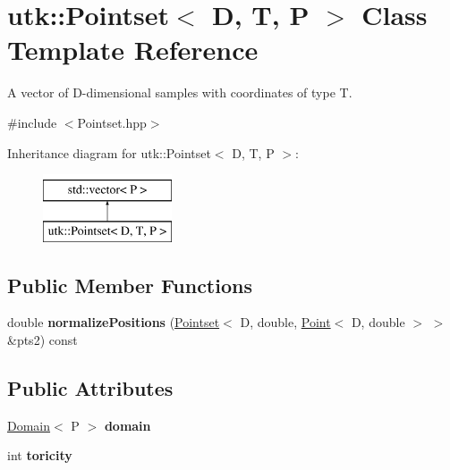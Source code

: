 \hypertarget{classutk_1_1Pointset}{\section{utk\-:\-:Pointset$<$ D, T, P $>$ Class Template Reference}
\label{classutk_1_1Pointset}
}


A vector of D-\/dimensional samples with coordinates of type T.  




{\ttfamily \#include $<$Pointset.\-hpp$>$}

Inheritance diagram for utk\-:\-:Pointset$<$ D, T, P $>$\-:\begin{figure}[H]
\begin{center}
\leavevmode
\includegraphics[height=2.000000cm]{classutk_1_1Pointset}
\end{center}
\end{figure}
\subsection*{Public Member Functions}
\begin{DoxyCompactItemize}
\item 
\hypertarget{classutk_1_1Pointset_ac112d4c6ebce6c272d33da5bb57581fe}{double {\bfseries normalize\-Positions} (\hyperlink{classutk_1_1Pointset}{Pointset}$<$ D, double, \hyperlink{classutk_1_1Point}{Point}$<$ D, double $>$ $>$ \&pts2) const }\label{classutk_1_1Pointset_ac112d4c6ebce6c272d33da5bb57581fe}

\end{DoxyCompactItemize}
\subsection*{Public Attributes}
\begin{DoxyCompactItemize}
\item 
\hypertarget{classutk_1_1Pointset_ae699b217e6196dd9f235dd98bd78bb56}{\hyperlink{structutk_1_1Domain}{Domain}$<$ P $>$ {\bfseries domain}}\label{classutk_1_1Pointset_ae699b217e6196dd9f235dd98bd78bb56}

\item 
\hypertarget{classutk_1_1Pointset_adc0cf94fe3594f9e61e9580962d66039}{int {\bfseries toricity}}\label{classutk_1_1Pointset_adc0cf94fe3594f9e61e9580962d66039}

\end{DoxyCompactItemize}


